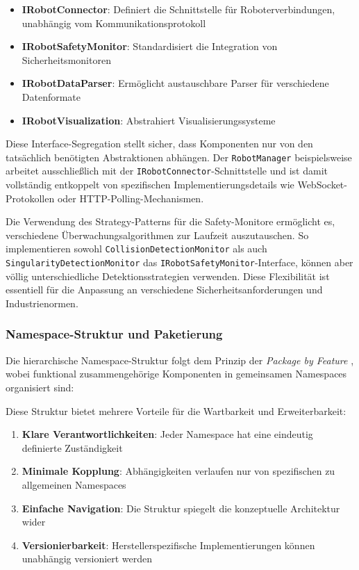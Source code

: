 \begin{itemize}
    \item \textbf{IRobotConnector}: Definiert die Schnittstelle für Roboterverbindungen, unabhängig vom Kommunikationsprotokoll
    \item \textbf{IRobotSafetyMonitor}: Standardisiert die Integration von Sicherheitsmonitoren
    \item \textbf{IRobotDataParser}: Ermöglicht austauschbare Parser für verschiedene Datenformate
    \item \textbf{IRobotVisualization}: Abstrahiert Visualisierungssysteme
\end{itemize}

Diese Interface-Segregation \cite{martin2003agile} stellt sicher, dass
Komponenten nur von den tatsächlich benötigten Abstraktionen abhängen. Der
\texttt{RobotManager} beispielsweise arbeitet ausschließlich mit der
\texttt{IRobotConnector}-Schnittstelle und ist damit vollständig entkoppelt von
spezifischen Implementierungsdetails wie WebSocket-Protokollen oder
HTTP-Polling-Mechanismen.

Die Verwendung des Strategy-Patterns \cite{gamma1995design} für die
Safety-Monitore ermöglicht es, verschiedene Überwachungsalgorithmen zur
Laufzeit auszutauschen. So implementieren sowohl
\texttt{CollisionDetectionMonitor} als auch
\texttt{SingularityDetectionMonitor} das
\texttt{IRobotSafetyMonitor}-Interface, können aber völlig unterschiedliche
Detektionsstrategien verwenden. Diese Flexibilität ist essentiell für die
Anpassung an verschiedene Sicherheitsanforderungen und Industrienormen.

\subsubsection{Namespace-Struktur und Paketierung}

Die hierarchische Namespace-Struktur folgt dem Prinzip der \emph{Package by
    Feature} \cite{uncle2012clean}, wobei funktional zusammengehörige Komponenten
in gemeinsamen Namespaces organisiert sind:


Diese Struktur bietet mehrere Vorteile für die Wartbarkeit und Erweiterbarkeit:

\begin{enumerate}
    \item \textbf{Klare Verantwortlichkeiten}: Jeder Namespace hat eine eindeutig definierte Zuständigkeit
    \item \textbf{Minimale Kopplung}: Abhängigkeiten verlaufen nur von spezifischen zu allgemeinen Namespaces
    \item \textbf{Einfache Navigation}: Die Struktur spiegelt die konzeptuelle Architektur wider
    \item \textbf{Versionierbarkeit}: Herstellerspezifische Implementierungen können unabhängig versioniert werden
\end{enumerate}

